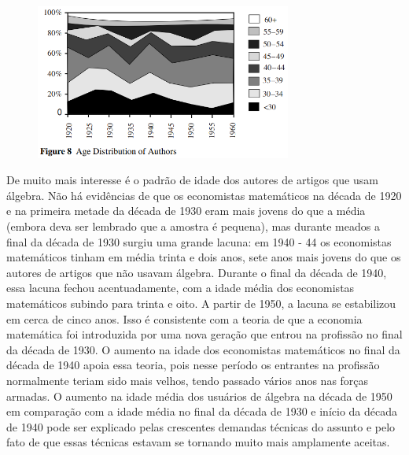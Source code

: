 \documentclass[12pt]{article}
\begin{document}
\begin{figure}[H]
    \centering
    \includegraphics[width=0.75\textwidth]{4º Período/História do Pensamento Econômico/Tradução HPE/Tradução Tópico 7.2/figure 8.png}
    \end{figure}

De muito mais interesse é o padrão de idade dos autores de artigos que usam álgebra. Não há evidências de que os economistas matemáticos na década de 1920 e na primeira metade da década de 1930 eram mais jovens do que a média (embora deva ser lembrado que a amostra é pequena), mas durante meados a final da década de 1930 surgiu uma grande lacuna: em 1940 - 44 os economistas matemáticos tinham em média trinta e dois anos, sete anos mais jovens do que os autores de artigos que não usavam álgebra. Durante o final da década de 1940, essa lacuna fechou acentuadamente, com a idade média dos economistas matemáticos subindo para trinta e oito. A partir de 1950, a lacuna se estabilizou em cerca de cinco anos. Isso é consistente com a teoria de que a economia matemática foi introduzida por uma nova geração que entrou na profissão no final da década de 1930. O aumento na idade dos economistas matemáticos no final da década de 1940 apoia essa teoria, pois nesse período os entrantes na profissão normalmente teriam sido mais velhos, tendo passado vários anos nas forças armadas. O aumento na idade média dos usuários de álgebra na década de 1950 em comparação com a idade média no final da década de 1930 e início da década de 1940 pode ser explicado pelas crescentes demandas técnicas do assunto e pelo fato de que essas técnicas estavam se tornando muito mais amplamente aceitas.
\end{document}
